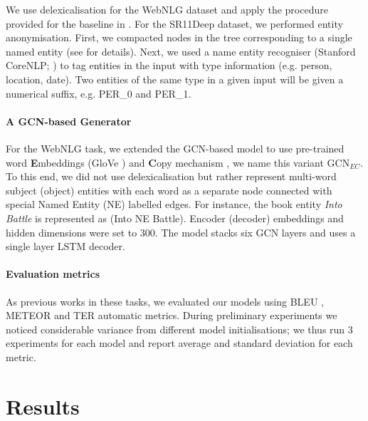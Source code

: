 \documentclass[11pt,a4paper,dvipsnames]{article}
\begin{document}
We use delexicalisation for the WebNLG dataset and apply 
the procedure provided for the baseline in \cite{gardent-EtAl:2017:INLG2017}. 
For the SR11Deep dataset, we performed entity anonymisation. 
First, we compacted nodes in the tree corresponding to a single 
named entity (see \cite{belz2011first} for details). 
Next, we used a name entity recogniser (Stanford CoreNLP; 
\cite{manning-EtAl:2014:P14-5}) to tag entities in the input 
with type information (e.g. person, location, date). Two 
entities of the same type in a given input will be given
a numerical suffix, e.g. PER\_0 and PER\_1.

\paragraph{A GCN-based Generator}
For the WebNLG task, we extended the GCN-based model to use pre-trained word \textbf{E}mbeddings (GloVe \cite{pennington2014glove})
and \textbf{C}opy mechanism \cite{P17-1099}, we name this variant GCN$_{EC}$. 
To this end, we did not use delexicalisation but rather
represent multi-word subject (object) entities with each word
as a separate node connected with special Named Entity (NE) labelled edges.
For instance, the book entity \emph{Into Battle} is represented as {\sffamily(Into NE Battle)}.
Encoder (decoder) embeddings and hidden dimensions were set to 300.
The model stacks six GCN layers and uses a single layer LSTM decoder.

\paragraph{Evaluation metrics}
As previous works in these tasks,
we evaluated our models using BLEU \cite{papineni2002bleu}, 
METEOR \cite{denkowski2014meteor} and TER \cite{snover2006study}
automatic metrics.
During preliminary experiments we noticed considerable variance 
from different model initialisations; we thus run 3 experiments 
for each model and report average and standard deviation for each metric.


\section{Results}
\label{sec:results}
\end{document}
